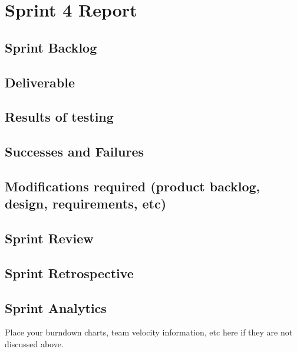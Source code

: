 
\section{Sprint 4 Report}
\subsection{Sprint Backlog}
\subsection{Deliverable}
\subsection{Results of testing}
\subsection{Successes and Failures}
\subsection{Modifications required (product backlog, design, requirements, etc)}
\subsection{Sprint Review}
\subsection{Sprint Retrospective}
\subsection{Sprint Analytics} 
Place your burndown charts, team velocity information, etc here if they are not discussed above.